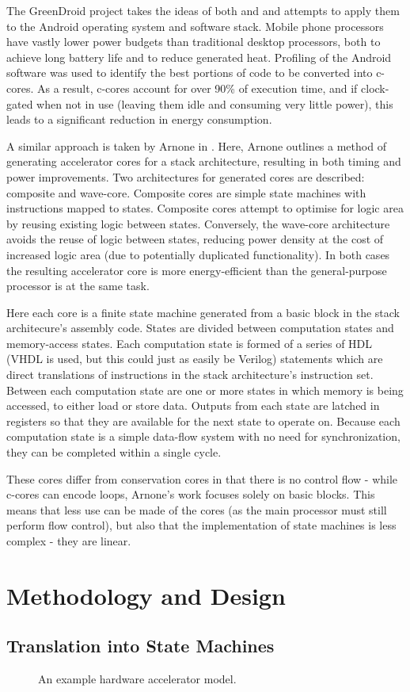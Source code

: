 \documentclass{UoYCSproject}
\begin{document}
The GreenDroid project \cite{greendroid} takes the ideas of both \cite{c-cores} and \cite{eco-cores} and attempts
to apply them to the Android operating system and software stack. Mobile phone processors have vastly lower power budgets than
traditional desktop processors, both to achieve long battery life and to reduce generated heat. Profiling of the Android
software was used to identify the best portions of code to be converted into c-cores. As a result,
c-cores account for over 90\% of execution time, and if clock-gated when not in use (leaving them idle and consuming
very little power), this leads to a significant reduction in energy consumption.

A similar approach is taken by Arnone in \cite{arnone-thesis}. Here, Arnone outlines a method of
generating accelerator cores for a stack architecture, resulting in both timing
and power improvements. Two architectures for generated cores are described: composite and wave-core.
Composite cores are simple state machines with instructions mapped to states. Composite cores attempt to
optimise for logic area by reusing existing logic between states. Conversely, the wave-core
architecture avoids the reuse of logic between states, reducing power density at the cost of increased
logic area (due to potentially duplicated functionality). In both cases the resulting accelerator core is
more energy-efficient than the general-purpose processor is at the same task.

Here each core is a finite state machine generated from a basic block in the stack architecure's
assembly code. States are divided between computation states and memory-access states. Each computation state
is formed of a series of HDL (VHDL is used, but this could just as easily be Verilog) statements which are direct
translations of instructions in the stack architecture's instruction set. Between each computation state are one
or more states in which memory is being accessed, to either load or store data. Outputs from each state are latched
in registers so that they are available for the next state to operate on. Because each computation state is a simple
data-flow system with no need for synchronization, they can be completed within a single cycle.

These cores differ from conservation cores in that there is no control flow - while c-cores can encode loops, Arnone's
work focuses solely on basic blocks. This means that less use can be made of the cores (as the main processor must still
perform flow control), but also that the implementation of state machines is less complex - they are linear.

\chapter{Methodology and Design}

\section{Translation into State Machines}

\begin{figure}[ht]
  \centering
  
  \caption{An example hardware accelerator model.}
\end{figure}

\printbibliography
\end{document}
